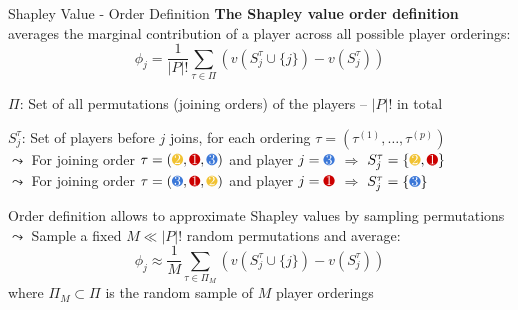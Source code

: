 \documentclass[10pt,compress,t,notes=noshow, xcolor=table]{beamer}
\newcommand{\Stau}{S_{j}^\tau}%
\begin{document}
\begin{framev}[align=top]{Shapley Value - Order Definition}
\textbf{The Shapley value order definition} averages the marginal contribution of a player across all possible player orderings:
$$\phi_j = \frac{1}{|P|!} \sum_{\tau \in \Pi} (v(\Stau \cup \{j\}) - v(\Stau))$$
\begin{itemizeM}
\item<+-> $\Pi$: Set of all permutations (joining orders) of the players -- $|P|!$ in total
\item<+-> $\Stau$: Set of players before $j$ joins, for each ordering $\tau = (\tau^{(1)}, \dots, \tau^{(p)})$\\
%
\phantom{$\Rightarrow$} $\leadsto$ For joining order $\tau = (\colorcircle{playeryellow}{white}{2},\colorcircle{playerred}{white}{1},\colorcircle{playerblue}{white}{3})$ and player $j=\colorcircle{playerblue}{white}{3}$ $\Rightarrow$ $\Stau = \{\colorcircle{playeryellow}{white}{2},\colorcircle{playerred}{white}{1}\}$\\
\phantom{$\Rightarrow$} $\leadsto$ For joining order $\tau = (\colorcircle{playerblue}{white}{3},\colorcircle{playerred}{white}{1},\colorcircle{playeryellow}{white}{2})$ and player $j=\colorcircle{playerred}{white}{1}$ $\Rightarrow$ $\Stau = \{\colorcircle{playerblue}{white}{3}\}$
\item<3-> Order definition allows to approximate Shapley values by sampling permutations\\
$\leadsto$ Sample a fixed $M \ll |P|!$ random permutations and average:
$$
\phi_j \approx \frac{1}{M} \sum_{\tau \in \Pi_M} \left(v(\Stau \cup \{j\}) - v(\Stau)\right)
$$
where $\Pi_M \subset \Pi$ is the random sample of $M$ player orderings
\end{itemizeM}
\end{framev}
\end{document}
